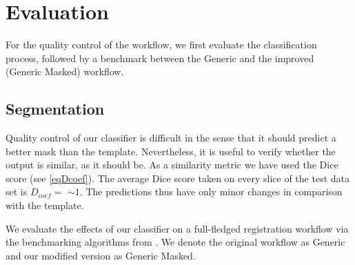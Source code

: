 \section{Evaluation}
For the quality control of the workflow, we first evaluate the classification process, followed by a benchmark between the Generic and the improved (Generic Masked) workflow.


\subsection{Segmentation}
Quality control of our classifier is difficult in the sense that it should predict a better mask than the template.
Nevertheless, it is useful to verify whether the output is similar, as it should be.
As a similarity metric we have used the Dice score (see \cref{eqDcoef}).
The average Dice score taken on every slice of the test data set is $D_{coef}= $  $\sim 1$.
The predictions thus have only minor changes in comparison with the template.


\begin{sansmath}
\end{sansmath}

We evaluate the effects of our classifier on a full-fledged registration workflow via the benchmarking algorithms from \cite{ioanas_optimized_2019}.
We denote the original workflow as Generic and our modified version as Generic Masked.

